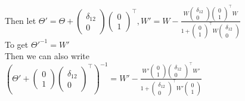 \documentclass[11pt]{article}
\begin{document}
\begin{enumerate}[a)]
Then let $\Theta' = \Theta + \begin{pmatrix} \delta_{12} \\ 0 \end{pmatrix} \begin{pmatrix} 0 \\ 1 \end{pmatrix}^\top, W' = W - \frac{W \begin{pmatrix} \delta_{12} \\ 0 \end{pmatrix} \begin{pmatrix} 0 \\ 1 \end{pmatrix}^\top W}{1 + \begin{pmatrix} 0 \\ 1 \end{pmatrix}^\top W \begin{pmatrix} \delta_{12} \\ 0 \end{pmatrix}}$\\
To get $\Theta'^{-1} = W'$\\
Then we can also write\\
$(\Theta' + \begin{pmatrix} 0 \\ 1 \end{pmatrix} \begin{pmatrix} \delta_{12} \\ 0 \end{pmatrix}^\top)^{-1} = W' - \frac{W' \begin{pmatrix} 0 \\ 1 \end{pmatrix} \begin{pmatrix} \delta_{12} \\ 0 \end{pmatrix}^\top W'}{1 + \begin{pmatrix} \delta_{12} \\ 0 \end{pmatrix}^\top W' \begin{pmatrix} 0 \\ 1 \end{pmatrix}}$\\

\end{enumerate}
\end{document}
